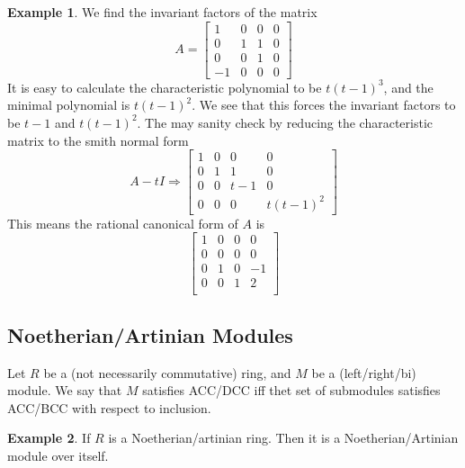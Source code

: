 \documentclass{article}
\theoremstyle{definition}
\theoremstyle{definition}
\theoremstyle{definition}
\theoremstyle{definition}
\theoremstyle{definition}
\theoremstyle{definition}
\theoremstyle{definition}
\newtheorem{example}{Example}[section]
\begin{document}
\begin{tcolorbox}[colback=yellow!5!white,colframe=yellow!30!white]
\begin{example}
We find the invariant factors of the matrix 
\[
    A=
    \begin{bmatrix}
    1&0&0&0\\
    0&1&1&0\\
    0&0&1&0\\
    -1&0&0&0
    \end{bmatrix}
\]
It is easy to calculate the characteristic polynomial to be $t(t-1)^3$, and the minimal polynomial is $t(t-1)^2$. We see that this forces the invariant factors to be $t-1$ and $t(t-1)^2$. The may sanity check by reducing the characteristic matrix to the smith normal form
\[
    A-tI \Longrightarrow
    \begin{bmatrix}
    1&0&0&0\\
    0&1&1&0\\
    0&0&t-1&0\\
    0&0&0&t(t-1)^2
    \end{bmatrix}
\]
This means the rational canonical form of $A$ is 
\[
 \begin{bmatrix}
 1&0&0&0\\
 0&0&0&0\\
 0&1&0&-1\\
 0&0&1&2\\
 \end{bmatrix}  
\]
\end{example}
\end{tcolorbox}



\subsection{Noetherian/Artinian Modules}
Let $R$ be a (not necessarily commutative) ring, and $M$ be a (left/right/bi) module. We say that $M$ satisfies ACC/DCC iff thet set of submodules satisfies ACC/BCC with respect to inclusion.


\begin{tcolorbox}[colback=yellow!5!white,colframe=yellow!30!white]
\begin{example}
If $R$ is a Noetherian/artinian ring. Then it is a Noetherian/Artinian module over itself. 
\end{example}
\end{tcolorbox}
\end{document}
